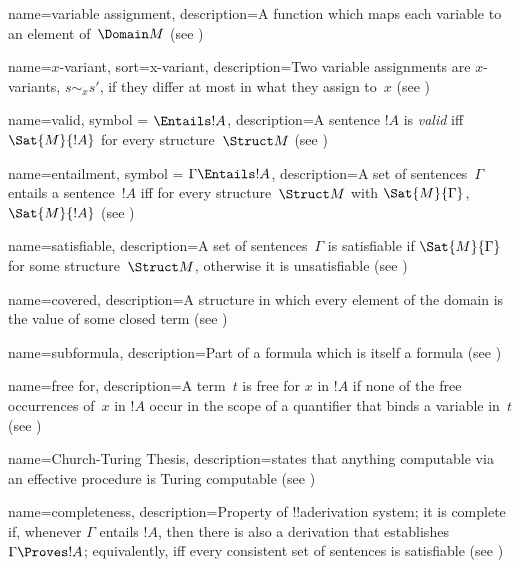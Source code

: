  {
  name=variable assignment,  
  description={A \gls{function} which maps each {variable} to an element
    of~$\Domain M$ (see )} }

 {
  name=$x$-variant,
  sort={x-variant},
  description={Two \glspl{variable assignment} are $x$-variants, $s \sim_x
    s'$, if they differ at most in what they assign to~$x$ (see
    )} }

 {
  name=valid,
  symbol = {\ensuremath{\Entails !A}},
  description={A sentence $!A$ is \emph{valid}  iff
    $\Sat{M}{!A}$ for every \gls{structure}~$\Struct M$ (see
    )} }

 {
  name=entailment,
  symbol = {\ensuremath{\Gamma \Entails !A}},
  description={A set of sentences~$\Gamma$ entails a
    sentence~$!A$ iff for every
    \gls{structure}~$\Struct M$ with $\Sat{M}{\Gamma}$, $\Sat{M}{!A}$
    (see )} }

 {
  name=satisfiable,
  description={A set of sentences~$\Gamma$ is satisfiable if
    $\Sat{M}{\Gamma}$ for some \gls{structure}~$\Struct M$, otherwise it
    is unsatisfiable (see )} }

 {
    name=covered,    
    description={A \gls{structure} in which every element of the
      domain is the {value} of some closed term (see
      )} }

 {
  name={subformula},  
  description={Part of a formula which is itself a formula (see
    )} }

 {
  name=free for,
  description={A term~$t$ is {free for} $x$ in $!A$ if none
    of the \gls{free} occurrences of~$x$ in $!A$ occur in the scope of a
    quantifier that binds a variable in~$t$ (see
    )} }

 {
  name=Church-Turing Thesis,
  description={states that anything computable via an effective
    procedure is Turing computable (see )} }

 {
  name=completeness, 
  description={Property of !!a{derivation} system; it is complete if, whenever
    $\Gamma$ entails $!A$, then there is also a {derivation} that
    establishes $\Gamma \Proves !A$; equivalently, iff
    every \gls{consistent} set of sentences is \gls{satisfiable}
    (see )} }

